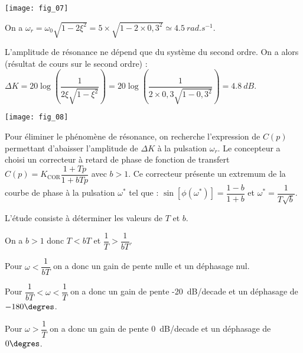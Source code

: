 \ifprof
\else
\begin{center}
\texttt{[image: fig\_07]}
\end{center}
\fi

\ifprof
\begin{corrige}
On a $\omega_r = \omega_0\sqrt{1-2\xi^2}=5\times \sqrt{1-2\times 0,3^2}\simeq \SI{4,5}{rad.s^{-1}}$.
\end{corrige}
\else
\fi


\ifprof
\begin{corrige}
L'amplitude de résonance ne dépend que du système du second ordre. On a alors (résultat de cours sur le second ordre) : 
$\Delta K = 20\log \left( \dfrac{1}{2\xi \sqrt{1-\xi^2}}\right)=20\log \left( \dfrac{1}{2\times 0,3 \sqrt{1-0,3^2}}\right)=\SI{4,8}{dB}$. 
\end{corrige}
\else
\fi

\ifprof
\else
\begin{marginfigure}
\texttt{[image: fig\_08]}
\end{marginfigure}
\fi

 \ifprof
 \else
Pour éliminer le phénomène de résonance, on recherche l’expression de $C(p)$ permettant d’abaisser
l’amplitude de $\Delta K$ à la pulsation $\omega_r$. Le concepteur a choisi un correcteur à retard de phase de fonction de
transfert $C(p)=K_{\text{COR}} \dfrac{1+Tp}{1+bTp}$ avec $b>1$. Ce correcteur présente un extremum de la courbe de phase à la pulsation $\omega^{*}$ tel que : $\sin\left[\phi\left(\omega^{*}\right)\right]=\dfrac{1-b}{1+b}$ et $\omega^{*}=\dfrac{1}{T\sqrt{b}}$.


L’étude consiste à déterminer les valeurs de $T$ et $b$.

\fi

\ifprof
\begin{corrige}
On a  $b>1$ donc $T<bT$ et $\dfrac{1}{T}>\dfrac{1}{bT}$. 

Pour $\omega<\dfrac{1}{bT}$ on a donc un gain de pente nulle et un déphasage nul. 

Pour $\dfrac{1}{bT}<\omega<\dfrac{1}{T}$ on a donc un gain de pente -\SI{20}{dB/decade} et un déphasage de $-180\degres$. 

Pour $\omega>\dfrac{1}{T}$ on a donc un gain de pente \SI{0}{dB/decade} et un déphasage de $0\degres$. 

\end{corrige}

